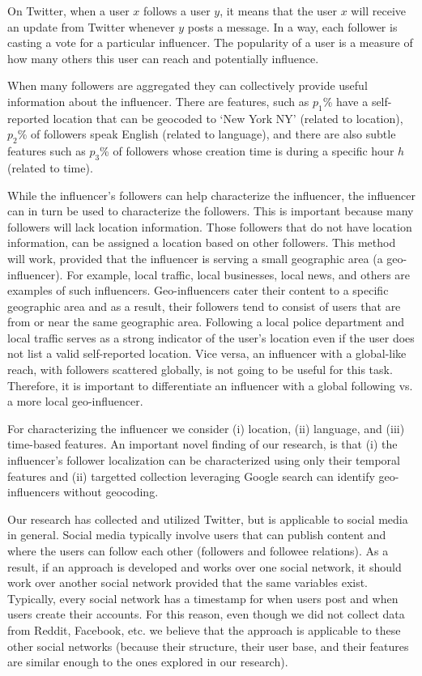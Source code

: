 On Twitter, when a user $x$ follows a user $y$, it means that the user $x$ will receive an update from Twitter whenever $y$ posts a message. In a way, each follower is casting a vote for a particular influencer. The popularity of a user is a measure of how many others this user can reach and potentially influence.

When many followers are aggregated they can collectively provide useful information about the influencer. There are features, such as $p_1$\% have a self-reported location that can be geocoded to `New York NY' (related to location), $p_2$\% of followers speak English (related to language), and there are also subtle features such as $p_3$\% of followers whose creation time is during a specific hour $h$ (related to time).

While the influencer's followers can help characterize the influencer, the influencer can in turn be used to characterize the followers. This is important because many followers will lack location information. Those followers that do not have location information, can be assigned a location based on other followers. This method will work, provided that the influencer is serving a small geographic area (a geo-influencer). For example, local traffic, local businesses, local news, and others are examples of such influencers. Geo-influencers cater their content to a specific geographic area and as a result, their followers tend to consist of users that are from or near the same geographic area. Following a local police department and local traffic serves as a strong indicator of the user's location even if the user does not list a valid self-reported location. Vice versa, an influencer with a global-like reach, with followers scattered globally, is not going to be useful for this task. Therefore, it is important to differentiate an influencer with a global following vs. a more local geo-influencer.

For characterizing the influencer we consider (i) location, (ii) language, and (iii) time-based features. An important novel finding of our research, is that (i) the influencer's follower localization can be characterized using only their temporal features and (ii) targetted collection leveraging Google search can identify geo-influencers without geocoding.

Our research has collected and utilized Twitter, but is applicable to social media in general. Social media typically involve users that can publish content and where the users can follow each other (followers and followee relations). As a result, if an approach is developed and works over one social network, it should work over another social network provided that the same variables exist. Typically, every social network has a timestamp for when users post and when users create their accounts. For this reason, even though we did not collect data from Reddit, Facebook, etc. we believe that the approach is applicable to these other social networks (because their structure, their user base, and their features are similar enough to the ones explored in our research).


